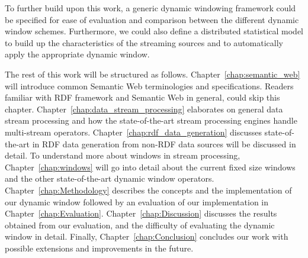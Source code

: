 To further build upon this work, a generic dynamic windowing 
framework could be specified for ease of evaluation and comparison between 
the different dynamic window schemes. Furthermore, we could also define a distributed 
statistical model to build up the characteristics of the streaming sources 
and to automatically apply the appropriate dynamic window. 


The rest of this work will be structured as follows. Chapter~\ref{chap:semantic_web} will 
introduce common Semantic Web terminologies and specifications. Readers familiar
with RDF framework and Semantic Web in general, could skip this chapter. 
Chapter~\ref{chap:data_stream_processing} elaborates on general data stream processing 
and how the state-of-the-art stream processing engines handle multi-stream operators. 
Chapter~\ref{chap:rdf_data_generation} discusses state-of-the-art in 
RDF data generation from non-RDF data sources will be discussed in detail. 
To understand more about windows in stream processing, Chapter~\ref{chap:windows}
will go into detail about the current fixed size windows and the other state-of-the-art 
dynamic window operators. Chapter~\ref{chap:Methodology} describes the concepts and the 
implementation of our dynamic window followed by an evaluation of our implementation in 
Chapter~\ref{chap:Evaluation}. Chapter~\ref{chap:Discussion} discusses the results 
obtained from our evaluation, and the difficulty of evaluating the dynamic window in detail. 
Finally, Chapter~\ref{chap:Conclusion} concludes our work with possible extensions and 
improvements in the future. 
